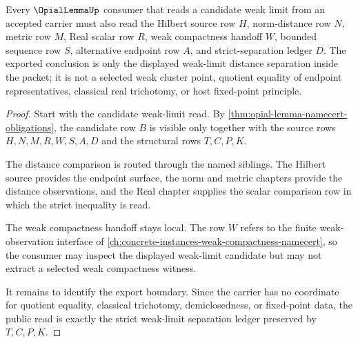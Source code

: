 \begin{theorem}
\label{thm:opial-lemma-weak-limit-separation}
Every $\OpialLemmaUp$ consumer that reads a candidate weak limit from an accepted carrier must also read the Hilbert source row $H$, norm-distance row $N$, metric row $M$, Real scalar row $R$, weak compactness handoff $W$, bounded sequence row $S$, alternative endpoint row $A$, and strict-separation ledger $D$. The exported conclusion is only the displayed weak-limit distance separation inside the packet; it is not a selected weak cluster point, quotient equality of endpoint representatives, classical real trichotomy, or host fixed-point principle.
\end{theorem}
\begin{proof}
Start with the candidate weak-limit read. By \autoref{thm:opial-lemma-namecert-obligations}, the candidate row $B$ is visible only together with the source rows $H,N,M,R,W,S,A,D$ and the structural rows $T,C,P,K$.

The distance comparison is routed through the named siblings. The Hilbert source provides the endpoint surface, the norm and metric chapters provide the distance observations, and the Real chapter supplies the scalar comparison row in which the strict inequality is read.

The weak compactness handoff stays local. The row $W$ refers to the finite weak-observation interface of \autoref{ch:concrete-instances-weak-compactness-namecert}, so the consumer may inspect the displayed weak-limit candidate but may not extract a selected weak compactness witness.

It remains to identify the export boundary. Since the carrier has no coordinate for quotient equality, classical trichotomy, demiclosedness, or fixed-point data, the public read is exactly the strict weak-limit separation ledger preserved by $T,C,P,K$.
\end{proof}



